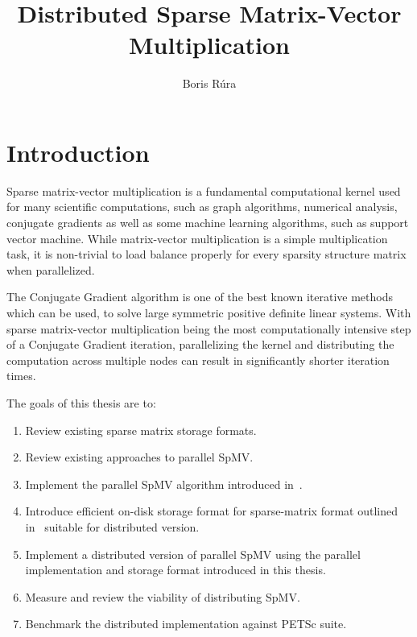 \documentclass[thesis=M,english]{FITthesis}[2019/12/23]
\title{Distributed Sparse Matrix-Vector Multiplication}
\author{Boris Rúra} %
\begin{document}
\tableofcontents

\chapter{Introduction}

Sparse matrix-vector multiplication is a fundamental computational kernel used for many
scientific computations, such as graph algorithms, numerical analysis, conjugate gradients
as well as some machine learning algorithms, such as support vector machine.
While matrix-vector multiplication is a simple multiplication task, it is non-trivial to load balance
properly for every sparsity structure matrix when parallelized.

The Conjugate Gradient algorithm is one of the best known iterative methods which can be used, to solve large
symmetric positive definite linear systems. With sparse matrix-vector multiplication being the most
computationally intensive step of a Conjugate Gradient iteration, parallelizing the kernel and distributing
the computation across multiple nodes can result in significantly shorter iteration times.

The goals of this thesis are to:

\begin{enumerate}
    \item Review existing sparse matrix storage formats.
    \item Review existing approaches to parallel SpMV\@.
    \item Implement the parallel SpMV algorithm introduced in~\cite{liu2015csr5}.
    \item Introduce efficient on-disk storage format for sparse-matrix format outlined
          in~\cite{liu2015csr5} suitable for distributed version.
    \item Implement a distributed version of parallel SpMV using the parallel implementation
          and storage format introduced in this thesis.
    \item Measure and review the viability of distributing SpMV\@.
    \item Benchmark the distributed implementation against PETSc suite.
\end{enumerate}



\end{document}
